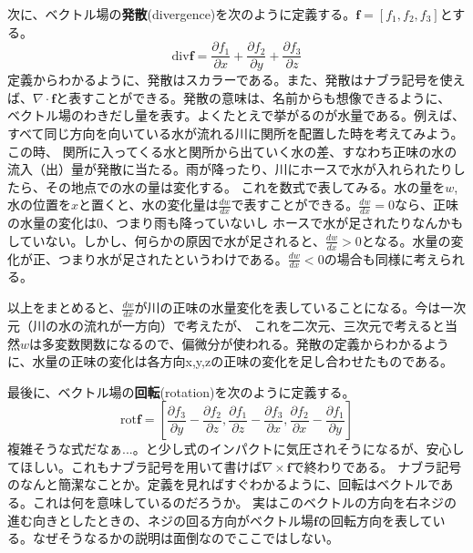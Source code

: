 \documentclass[a4j,dvipdfmx]{jsarticle}
\begin{document}
            次に、ベクトル場の\textbf{発散}(divergence)を次のように定義する。$\bm{f}=[f_1,f_2,f_3]$とする。
            \begin{equation}
                \mathrm{div} \bm{f} = \frac{\partial f_1}{\partial x}+\frac{\partial f_2}{\partial y}+\frac{\partial f_3}{\partial z}
            \end{equation}
            定義からわかるように、発散はスカラーである。また、発散はナブラ記号を使えば、$\nabla\cdot \bm{f}$と表すことができる。発散の意味は、名前からも想像できるように、
            ベクトル場のわきだし量を表す。よくたとえで挙がるのが水量である。例えば、すべて同じ方向を向いている水が流れる川に関所を配置した時を考えてみよう。この時、
            関所に入ってくる水と関所から出ていく水の差、すなわち正味の水の流入（出）量が発散に当たる。雨が降ったり、川にホースで水が入れられたりしたら、その地点での水の量は変化する。
            これを数式で表してみる。水の量を$w$,水の位置を$x$と置くと、水の変化量は$\frac{dw}{dx}$で表すことができる。$\frac{dw}{dx}=0$なら、正味の水量の変化は$0$、つまり雨も降っていないし
            ホースで水が足されたりなんかもしていない。しかし、何らかの原因で水が足されると、$\frac{dw}{dx}>0$となる。水量の変化が正、つまり水が足されたというわけである。$\frac{dw}{dx}<0$の場合も同様に考えられる。

            以上をまとめると、$\frac{dw}{dx}$が川の正味の水量変化を表していることになる。今は一次元（川の水の流れが一方向）で考えたが、
            これを二次元、三次元で考えると当然$w$は多変数関数になるので、偏微分が使われる。発散の定義からわかるように、水量の正味の変化は各方向x,y,zの正味の変化を足し合わせたものである。

            最後に、ベクトル場の\textbf{回転}(rotation)を次のように定義する。
            \begin{equation}
                \mathrm{rot}\bm{f}=\left[\frac{\partial f_3}{\partial y}-\frac{\partial f_2}{\partial z},\frac{\partial f_1}{\partial z}-\frac{\partial f_3}{\partial x},\frac{\partial f_2}{\partial x}-\frac{\partial f_1}{\partial y}\right]
            \end{equation}
            複雑そうな式だなぁ...。と少し式のインパクトに気圧されそうになるが、安心してほしい。これもナブラ記号を用いて書けば$\nabla \times \bm{f}$で終わりである。
            ナブラ記号のなんと簡潔なことか。定義を見ればすぐわかるように、回転はベクトルである。これは何を意味しているのだろうか。
            実はこのベクトルの方向を右ネジの進む向きとしたときの、ネジの回る方向がベクトル場$\bm{f}$の回転方向を表している。なぜそうなるかの説明は面倒なのでここではしない。\\
\end{document}
